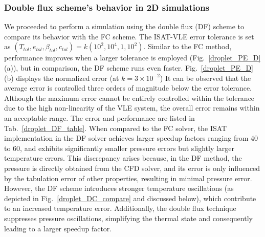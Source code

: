 \subsubsection{Double flux scheme's behavior in 2D simulations}
\label{sec:DF}
We proceeded to perform a simulation using the double flux (DF) scheme to compare its behavior with the FC scheme. The ISAT-VLE error tolerance is set as $(T_{tol},e_{tol},\beta_{tol},c_{tol})= k (10^2, 10^4, 1, 10^2)$. Similar to the FC method,  performance improves when a larger tolerance is employed (Fig.~\ref{droplet_PE_D}(a)), but in comparison, the DF scheme runs even faster. Fig.~\ref{droplet_PE_D}(b) displays the normalized error (at $k=3 \times 10^{-2}$) It can be observed that the average error is controlled three orders of magnitude below the error tolerance. Although the maximum error cannot be entirely controlled within the tolerance due to the high non-linearity of the VLE system, the overall error remains within an acceptable range. The error and performance are listed in Tab.~\ref{droplet_DF_table}. When compared to the FC solver, the ISAT implementation in the DF solver achieves larger speedup factors ranging from 40 to 60, and exhibits significantly smaller pressure errors but slightly larger temperature errors. This discrepancy arises because, in the DF method, the pressure is directly obtained from the CFD solver, and its error is only influenced by the tabulation error of other properties, resulting in minimal pressure error. However, the DF scheme introduces stronger temperature oscillations (as depicted in Fig.~\ref{droplet_DC_compare} and discussed below), which contribute to an increased temperature error. Additionally, the double flux technique suppresses pressure oscillations, simplifying the thermal state and consequently leading to a larger speedup factor.



